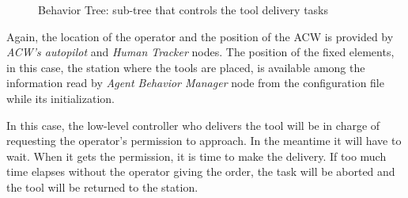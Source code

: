 \begin{figure}[ht]
\begin{center}
{}
		\caption{Behavior Tree: sub-tree that controls the tool delivery tasks}
		\label{fig:DeliverToolTree}
	\end{center}
\end{figure}

Again, the location of the operator and the position of the \gls{ACW} is provided by \emph{\gls{ACW}'s autopilot} and \emph{Human Tracker} nodes. The position of the fixed elements, in this case, the station where the tools are placed, is available among the information read by \emph{Agent Behavior Manager} node from the configuration file while its initialization.

In this case, the low-level controller who delivers the tool will be in charge of requesting the operator's permission to approach. In the meantime it will have to wait. When it gets the permission, it is time to make the delivery. If too much time elapses without the operator giving the order, the task will be aborted and the tool will be returned to the station.

